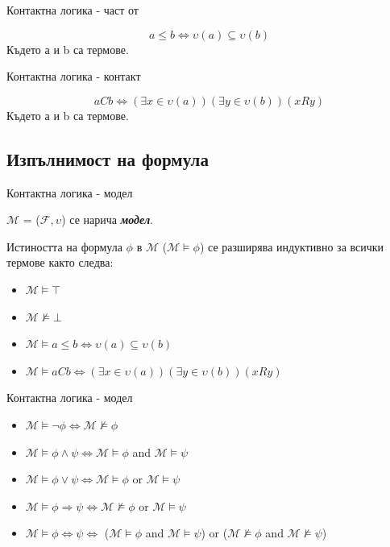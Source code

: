 \documentclass[14pt, aspectratio=169]{beamer}
\newcommand\M{\mathcal{M}}
\newcommand\F{\mathcal{F}}
\begin{document}
\begin{frame}{Контактна логика - част от}
	\begin{definition}[Част от]
		\begin{equation*}
			a \leq b \iff \upsilon(a) \subseteq \upsilon(b)
		\end{equation*}
		Където а и b са термове.
	\end{definition}
\end{frame}

\begin{frame}{Контактна логика - контакт}
	\begin{definition}[Контакт]
		\begin{equation*}
			aCb \iff (\exists x \in \upsilon(a))(\exists y \in \upsilon(b))(xRy)
		\end{equation*}
		Където а и b са термове.
	\end{definition}
\end{frame}

\subsection{Изпълнимост на формула}

\begin{frame}{Контактна логика - модел}
	\begin{definition}[Модел]
		$\M$ = ($\F, \upsilon$) се нарича \textbf{\textit{модел}}.

		Истиността на формула $\phi$ в $\M$ ($\M \models \phi$) се разширява индуктивно за всички термове както следва:
		\begin{itemize}
			\item $\M \models \top$
			\item $\M \not\models \bot$
			\item $\M \models a \leq b \iff \upsilon(a) \subseteq \upsilon(b)$
			\item $\M \models aCb \iff (\exists x \in \upsilon(a))(\exists y \in \upsilon(b))(xRy)$
		\end{itemize}
	\end{definition}
\end{frame}

\begin{frame}{Контактна логика - модел}
	\begin{definition}[Модел]
		\begin{itemize}
			\item $\M \models \neg \phi \iff \M \not\models \phi$
			\item $\M \models \phi \land \psi \iff \M \models \phi$ and $\M \models \psi$
			\item $\M \models \phi \lor \psi \iff \M \models \phi$ or $\M \models \psi$
			\item $\M \models \phi \Rightarrow \psi \iff \M \not\models \phi$ or $\M \models \psi$
			\item $\M \models \phi \Leftrightarrow \psi \iff$ ($\M \models \phi$ and $\M \models \psi$) or ($\M \not\models \phi$ and $\M \not\models \psi$)
		\end{itemize}
	\end{definition}
\end{frame}
\end{document}
